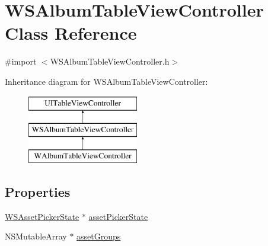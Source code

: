 \hypertarget{interface_w_s_album_table_view_controller}{\section{W\-S\-Album\-Table\-View\-Controller Class Reference}
\label{interface_w_s_album_table_view_controller}
}


{\ttfamily \#import $<$W\-S\-Album\-Table\-View\-Controller.\-h$>$}

Inheritance diagram for W\-S\-Album\-Table\-View\-Controller\-:\begin{figure}[H]
\begin{center}
\leavevmode
\includegraphics[height=3.000000cm]{interface_w_s_album_table_view_controller}
\end{center}
\end{figure}
\subsection*{Properties}
\begin{DoxyCompactItemize}
\item 
\hyperlink{interface_w_s_asset_picker_state}{W\-S\-Asset\-Picker\-State} $\ast$ \hyperlink{interface_w_s_album_table_view_controller_a8e9771fe2f25a4b438cad69c08d2e88a}{asset\-Picker\-State}
\item 
N\-S\-Mutable\-Array $\ast$ \hyperlink{interface_w_s_album_table_view_controller_aa16409464a0d4eacc24b7c2c90489e7c}{asset\-Groups}
\end{DoxyCompactItemize}


